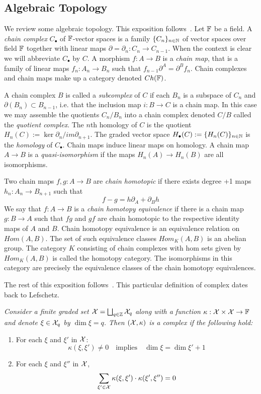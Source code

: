 \subsection{Algebraic Topology}\label{sec:prelims:AT}

We review some algebraic topology.  This exposition follows~\cite{weibel}.  Let ${\mathbb{F}}$ be a field.  A {\em chain complex} $C_\bullet$ of ${\mathbb{F}}$-vector spaces is a family $\{C_n\}_{n\in {\mathbb{N}}}$ of vector spaces over field ${\mathbb{F}}$ together with linear maps $\partial=\partial_n:C_n\to C_{n-1}$.  When the context is clear we will abbreviate $C_\bullet$ by $C$.  A morphism $f:A\to B$ is a {\em chain map}, that is a family of linear maps $f_n:A_n\to B_n$ such that $f_{n-1}\partial^A = \partial^B f_n$. Chain complexes and chain maps make up a category denoted $Ch({\mathbb{F}})$.  

A chain complex $B$ is called a {\em subcomplex} of $C$ if each $B_n$ is a subspace of $C_n$ and $\partial(B_n)\subset B_{n-1}$, i.e. that the inclusion map $i:B\to C$ is a chain map.  In this case we may assemble the quotients $C_n/B_n$ into a chain complex denoted $C/B$ called the {\em quotient complex}.   The $n$th homology of $C$ is the quotient $H_n(C):= \ker \partial_n/im \partial_{n+1}$.  The graded vector space $H_\bullet(C) := \{H_n(C)\}_{n\in {\mathbb{N}}}$ is the {\em homology} of $C_\bullet$.  Chain maps induce linear maps on homology.  A chain map $A\to B$ is a {\em quasi-isomorphism} if the maps $H_n(A)\to H_n(B)$ are all isomorphisms.

Two chain maps $f,g:A\to B$ are {\em chain homotopic} if there exists degree +1 maps $h_n:A_n\to B_{n+1}$ such that $$f-g = h\partial_A+\partial_Bh$$  We say that $f:A\to B$ is a {\em chain homotopy equivalence} if there is a chain map $g:B\to A$ such that $fg$ and $gf$ are chain homotopic to the respective identity maps of $A$ and $B$.  Chain homotopy equivalence is an equivalence relation on $Hom(A,B)$.  The set of such equivalence classes $Hom_K(A,B)$ is an abelian group.  The category $K$ consisting of chain complexes with hom sets given by $Hom_K(A,B)$ is called the homotopy category.  The isomorphisms in this category are precisely the equivalence classes of the chain homotopy equivalences.


The rest of this exposition follows~\cite{focm,mn}.  This particular definition of complex dates back to Lefschetz.

\begin{defn}
{\em
Consider a finite graded set ${\mathcal X} = \bigsqcup_{q\in {\mathbb{Z}}} {\mathcal X}_q$ along with a function $\kappa:{\mathcal X}\times{\mathcal X}\to {\mathbb{F}}$ and denote $\xi\in {\mathcal X}_q$ by $\dim \xi = q$.  Then $({\mathcal X},\kappa)$ is a {\em complex} if the following hold:
\begin{enumerate}
\item \label{cond:1} For each $\xi$ and $\xi'$ in ${\mathcal X}$:
$$\kappa(\xi,\xi')\neq 0\quad\text{implies}\quad \dim \xi = \dim \xi'+1$$
\item\label{cond:2} For each $\xi$ and $\xi''$ in ${\mathcal X}$,
$$\sum_{\xi'\in {\mathcal X}} \kappa(\xi,\xi')\cdot \kappa(\xi',\xi'')=0$$
\end{enumerate}
}
\end{defn}

